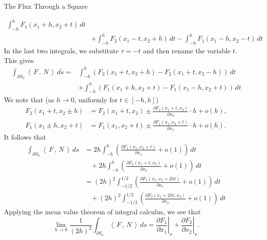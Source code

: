\documentclass[smaller,hyperref={CJKbookmarks=true}]{beamer}
\newcommand{\scp}[2]{\left\langle\,#1\,,\,#2\,\right\rangle} \newcommand{\scpp}{\langle\,\cdot\,,\,\cdot\,\rangle}
\begin{document}
\begin{frame}{The Flux Through a Square}
\begin{spacing}{1.05}
\begin{equation*}
\begin{split}
     \int_{-h}^{h}F_1(x_1+h,x_2+t)\,dt \\
       &+\int_{-h}^{h}F_2(x_1-t,x_2+h)\,dt-
       \int_{-h}^{h}F_1(x_1-h,x_2-t)\,dt
  \end{split}
\end{equation*}
In the last two integrals, we substitute $\tau=-t$ and then rename the variable $t$.
\newpage
This gives
\begin{equation*}
  \begin{split}
     \int_{\partial S_h}\scp{F}{N}\,ds= &\int_{-h}^{h}\left(F_2(x_1+t,x_2+h)-F_2
     (x_1+t,x_2-h)\right)\,dt \\
       &+\int_{-h}^{h}\left(F_1(x_1+h,x_2+t)-F_1(x_1-h,x_2+t)\right)\,dt
  \end{split}
\end{equation*}
We note that (as $h\to0$, uniformly for $t\in[-h,h]$)
\begin{align*}
  F_2(x_1+t,x_2\pm h) &=F_2(x_1+t,x_2)\pm\frac{\partial F_2(x_1+t,x_2)}{\partial x_2}\cdot h+o(h), \\
  F_1(x_1\pm h,x_2+t) &=F_1(x_1,x_2+t)\pm\frac{\partial F_1(x_1,x_2+t)}{\partial x_1}\cdot h+o(h).
\end{align*}
\newpage
It follows that
\begin{align*}
  \int_{\partial S_h}\scp{F}{N}\,ds &=2h\int_{-h}^{h}\left(\frac{\partial F_1(x_1,x_2+t)}{\partial x_1}+o(1)\right)\,dt \\
   &~~~~+2h\int_{-h}^{h}\left(\frac{\partial F_2(x_1+t,x_2)}{\partial x_2}+o(1)\right)\,dt  \\
   &=(2h)^2\int_{-1/2}^{1/2}\left(\frac{\partial F_1(x_1,x_2+2ht)}{\partial x_1}+o(1)\right)\,dt  \\
   &~~~~+(2h)^2\int_{-1/2}^{1/2}\left(\frac{\partial F_2(x_1+2ht,x_2)}{\partial x_2}+o(1)\right)\,dt
\end{align*}
Applying the mean value theorem of integral calculus, we see that
\[\lim_{h\to0}\frac{1}{(2h)^2}\int_{\partial S_h}\scp{F}{N}\,ds=\left.\frac{\partial F_1}{\partial x_1}\right|_x+\left.\frac{\partial F_2}{\partial x_2}\right|_x.\]
\end{spacing}
\end{frame}
\end{document}
